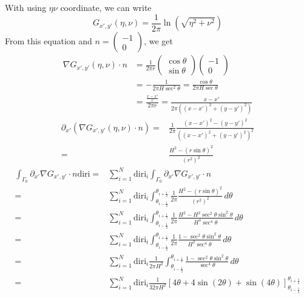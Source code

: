 \documentclass[a4paper,12pt]{article}
\newcommand{\integ}[3]{%
\ensuremath{\displaystyle{\int^{#2}_{#1} #3}}}
\begin{document}
\begin{enumerate}
With using $\eta\nu$ coordinate, we can write
\begin{equation}
 G_{x',y'}(\eta,\nu)=\frac{1}{2\pi} \ln \left(\sqrt{\eta^2+\nu^2}\right)
\end{equation}
From this equation and $n=\left(\begin{array}{c}
      -1 \\
      0
    \end{array}\right)$, we get
\begin{align}
 \nabla G_{x',y'}(\eta,\nu) \cdot n&=\frac{1}{2\pi r} \left(\begin{array}{c}
      \cos\theta \\
      \sin \theta
    \end{array}\right) 
    \left(\begin{array}{c}
      -1 \\
      0
    \end{array}\right)\\
    &=-\frac{1}{2\pi H \sec^2\theta} =\frac{\cos \theta}{2\pi H \sec \theta}\\
    &=\frac{\frac{x-x'}{r}}{2 \pi r}=\frac{x-x'}{2 \pi \left((x-x')^2+(y-y')^2\right)}\label{NablaGn}
\end{align}
\begin{align}
 \partial_{x'}\left( \nabla G_{x',y'}(\eta,\nu) \cdot n \right)=&\frac{1}{2\pi} \frac{(x-x')^2-(y-y')^2}{\left((x-x')^2+(y-y')^2 \right)^2}\\
 =& \frac{H^2-(r\sin \theta)^2}{(r^2)^2}
\end{align}
\begin{align}
 \integ{\Gamma_0}{}{\partial_{x'}\nabla G_{x',y'} \cdot n \text{diri}}=& \sum\limits_{i=1}^N \text{diri}_i \integ{\Gamma_0}{}{\partial_{x'}\nabla G_{x',y'} \cdot n}\\
 =& \sum\limits_{i=1}^N \text{diri}_i \integ{\theta_{i-\frac{1}{2}}}{\theta_{i+\frac{1}{2}}}{\frac{1}{2\pi} \frac{H^2-(r\sin\theta)^2}{\left(r^2\right)^2} \, d\theta}\\
=&\sum\limits_{i=1}^N \text{diri}_i \integ{\theta_{i-\frac{1}{2}}}{\theta_{i+\frac{1}{2}}}{\frac{1}{2\pi} \frac{H^2-H^2 \sec^2\theta \sin^2\theta}{H^4\sec^4\theta} \, d\theta}\\
=&\sum\limits_{i=1}^N \text{diri}_i \integ{\theta_{i-\frac{1}{2}}}{\theta_{i+\frac{1}{2}}}{\frac{1}{2\pi} \frac{1-\sec^2\theta \sin^2\theta}{H^2 \sec^4\theta} \, d\theta}\\
=&\sum\limits_{i=1}^N \text{diri}_i \frac{1}{2\pi H^2} \integ{\theta_{i-\frac{1}{2}}}{\theta_{i+\frac{1}{2}}}{\frac{1-\sec^2\theta \sin^2\theta}{\sec^4\theta} \, d\theta}\\
=& \sum\limits_{i=1}^N \text{diri}_i \frac{1}{32\pi H^2} \left[4\theta + 4 \sin(2\theta) + \sin (4\theta) \right]_{\theta_{i-\frac{1}{2}}}^{\theta_{i+\frac{1}{2}}}\label{intPartialNablaGn}
\end{align}
\end{enumerate}
\end{document}

